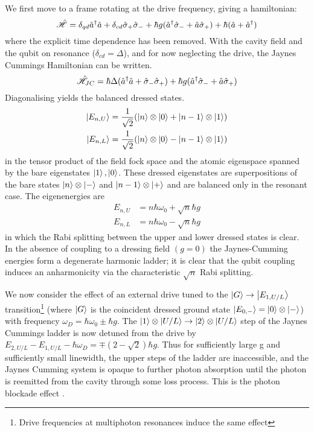 We first move to a frame rotating at the drive frequency, giving a hamiltonian:
\begin{equation}
  \hat{\mathscr{H}} = \delta_{qd} {\hat{a}^\dagger} \hat{a} + \delta_{cd} \hat{\sigma}_+ \hat{\sigma}_- + \hbar g ({\hat{a}^\dagger} \hat{\sigma}_- + \hat{a} \hat{\sigma}_+) + \hbar (\hat{a} + {\hat{a}^\dagger})
\end{equation}
where the explicit time dependence has been removed.
With the cavity field and the qubit on resonance ($\delta_{cd} = \Delta$), and for now neglecting the drive, the Jaynes Cummings Hamiltonian can be written.
\begin{equation}
  \hat{\mathscr{H}}_{JC} = \hbar \Delta ({\hat{a}^\dagger} \hat{a} + \hat{\sigma}_- \hat{\sigma}_+) +\hbar g ({\hat{a}^\dagger} \hat{\sigma}_- + \hat{a} \hat{\sigma}_+)
\end{equation}
Diagonalising yields the balanced dressed states.
\begin{align}
  \ket{E_{n, U}} & = \frac{1}{\sqrt{2}} (\ket{n} \otimes\ket{0}+\ket{n-1} \otimes\ket{1}) \\
  \ket{E_{n, L}} & = \frac{1}{\sqrt{2}} (\ket{n} \otimes\ket{0}-\ket{n-1} \otimes\ket{1})
\end{align}
in the tensor product of the field fock space and the atomic eigenspace spanned by the bare eigenstates $\ket{1}, \ket{0}$. These dressed eigenstates are superpositions of the bare states $\ket{n} \otimes\ket{-}$ and $\ket{n-1} \otimes\ket{+}$ and are balanced only in the resonant case. The eigenenergies are
\begin{align}
  E_{n, U} &= n \hbar \omega_0 + \sqrt{n} \hbar g \\
  E_{n, L} &= n \hbar \omega_0 - \sqrt{n} \hbar g
\end{align}
in which the Rabi splitting between the upper and lower dressed states is clear. In the absence of coupling to a dressing field $(g=0)$ the Jaynes-Cumming energies form a degenerate harmonic ladder; it is clear that the qubit coupling induces an anharmonicity via the characteristic $\sqrt{n}$ Rabi splitting.

We now consider the effect of an external drive tuned to the $\ket{G} \rightarrow \ket{E_{1, U/L}}$ transition\footnote{Drive frequencies at multiphoton resonances induce the same effect} (where $\ket{G}$ is the coincident dressed ground state $\ket{E_{0, -}} = \ket{0} \otimes\ket{-}$) with frequency $\omega_D = \hbar \omega_0 \pm \hbar g$.
The $\ket{1} \otimes\ket{U/L} \rightarrow \ket{2} \otimes\ket{U/L}$ step of the Jaynes Cummings ladder is now detuned from the drive by $E_{2, U/L} - E_{1, U/L} - \hbar \omega_D =  \mp(2-\sqrt{2}) \hbar g$. Thus for sufficiently large g and sufficiently small linewidth, the upper steps of the ladder are inaccessible, and the Jaynes Cumming system is opaque to further photon absorption until the photon is reemitted from the cavity through some loss process. This is the photon blockade effect \cite{Birnbaum2005}.
